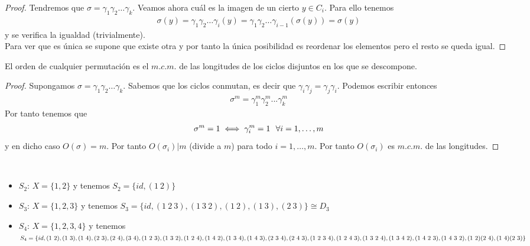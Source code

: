 \begin{teo}
\begin{proof}
        Tendremos que $\sigma = \gamma_1\gamma_2\dots \gamma_k$. Veamos ahora cuál es la imagen de un cierto $y\in C_i$. Para ello tenemos
        \begin{gather*}
            \sigma(y)=\gamma_1\gamma_2\dots\gamma_i(y) = \gamma_1\gamma_2\dots\gamma_{i-1}(\sigma(y)) = \sigma(y)
        \end{gather*}
        y se verifica la igualdad (trivialmente).\\

        Para ver que es única se supone que existe otra y por tanto la única posibilidad es reordenar los elementos pero el resto se queda igual.
    \end{proof}
 \end{teo}

 \begin{coro}
    El orden de cualquier permutación es el $m.c.m.$ de las longitudes de los ciclos disjuntos en los que se descompone.
    \begin{proof}
        Supongamos $\sigma = \gamma_1\gamma_2\dots\gamma_k$. Sabemos que los ciclos conmutan, es decir que $\gamma_i\gamma_j=\gamma_j\gamma_i$. Podemos escribir entonces 
        \begin{gather*}
            \sigma^m = \gamma_1^m\gamma_2^m...\gamma_k^m
        \end{gather*}
        Por tanto tenemos que
        \begin{gather*}
            \sigma^m = 1 \iff \gamma_i^m = 1\ \ \forall i=1,\dots,m
        \end{gather*}
        y en dicho caso $O(\sigma)=m$. Por tanto $O(\sigma_i)|m$ (divide a $m$) para todo $i=1,\dots,m$. Por tanto $O(\sigma_i)$ es $m.c.m.$ de las longitudes.
    \end{proof}
 \end{coro}

 \begin{ejemplo}\
    \begin{itemize}
        \item $S_2$: $X=\{1,2\}$ y tenemos $S_2 = \{id, (1\ 2)\}$
        \item $S_3$: $X=\{1,2,3\}$ y tenemos $S_3 = \{id, (1\ 2\ 3), (1\ 3\ 2), (1\ 2), (1\ 3),(2\ 3)\} \cong D_3$ 
        \item $S_4$: $X=\{1,2,3,4\}$ y tenemos $S_4 = \{id, (1\ 2), (1\ 3), (1\ 4), (2\ 3), (2\ 4), (3\ 4),\\ (1\ 2\ 3), (1\ 3\ 2), (1\ 2\ 4), (1\ 4\ 2), (1\ 3\ 4), (1\ 4\ 3), (2\ 3\ 4), (2\ 4\ 3), (1\ 2\ 3\ 4), (1\ 2\ 4\ 3),\\ (1\ 3\ 2\ 4), (1\ 3\ 4\ 2), (1\ 4\ 2\ 3), (1\ 4\ 3\ 2), (1\ 2)(2\ 4), (1\ 4)(2\ 3) \}$ 
    \end{itemize}
 \end{ejemplo}

